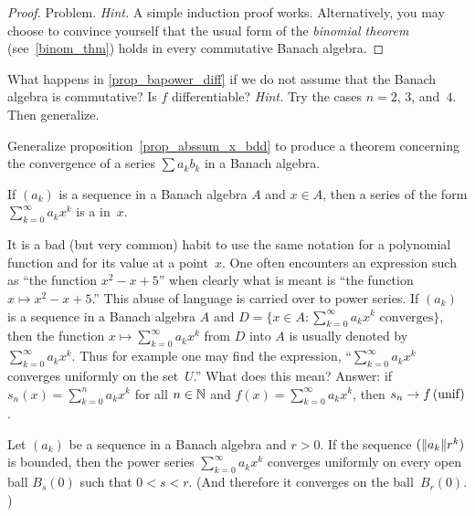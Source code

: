 \begin{proof} Problem.  \emph{Hint.}  A simple induction proof works.  Alternatively, you may
choose to convince yourself that the usual form of the \emph{binomial theorem}
(see~\ref{binom_thm}) holds in every commutative Banach algebra.   \ns
\end{proof}

\begin{prob}  What happens in \ref{prop_bapower_diff} if we do not assume that the Banach algebra
is commutative?  Is $f$ differentiable? \emph{Hint.}  Try the cases $n = 2$, $3$, and~$4$.
Then generalize.
\end{prob}

\begin{prob}  Generalize proposition~\ref{prop_abssum_x_bdd} to produce a theorem concerning the
convergence of a series $\sum a_kb_k$ in a Banach algebra.
\end{prob}


\begin{defn} If $(a_k)$ is a sequence in a Banach algebra $A$ and $x \in A$, then a series of the
form $\sum_{k=0}^\infty a_kx^k$ is a
 in~$x$.
\end{defn}

\begin{notn} It is a bad (but very common) habit to use the same notation for a polynomial function
and for its value at a point~$x$.  One often encounters an expression such as ``the function
$x^2 - x + 5$'' when clearly what is meant is ``the function $x \mapsto x^2 - x + 5$.''  This
abuse of language is carried over to power series. If $(a_k)$ is a sequence in a Banach
algebra $A$ and $D = \{x \in A\colon \sum_{k=0}^\infty a_kx^k \text{ converges}\}$, then the
function $x \mapsto \sum_{k=0}^\infty a_kx^k$ from $D$ into $A$ is usually denoted by
$\sum_{k=0}^\infty a_kx^k$.  Thus for example one may find the expression,
``$\sum_{k=0}^\infty a_kx^k$ converges uniformly on the set~$U$.''  What does this mean?
Answer: if $s_n(x) = \sum_{k=0}^n a_kx^k$ for all $n \in \mathbb{N}$ and $f(x) = \sum_{k=0}^\infty
a_kx^k$, then $s_n \rightarrow f\text{\,(unif)}$.
\end{notn}

\begin{prop}\label{prop_pser_unif_conv}  Let $(a_k)$ be a sequence in a Banach algebra and
$r > 0$.  If the sequence $(\lVert a_k\rVert r^k)$ is bounded, then the power series
$\sum_{k=0}^\infty a_kx^k$ converges uniformly on every open ball $B_s(0)$ such that $0 < s <
r$.  (And therefore it converges on the ball~$B_r(0)$. )
\end{prop}

